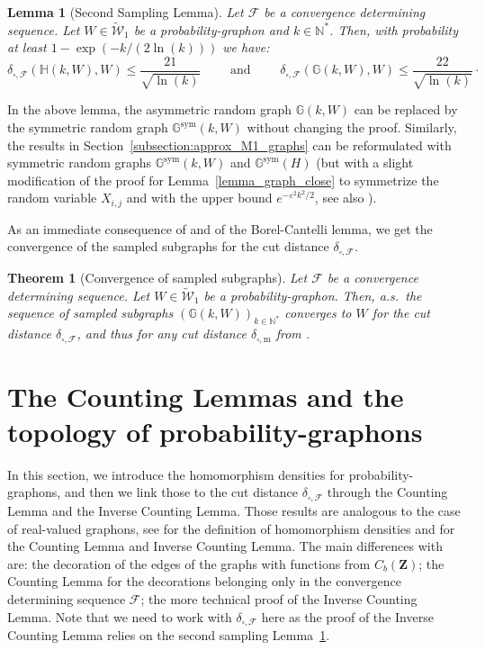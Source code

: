 \documentclass{amsart}
\newcommand{\as}{a.s.\ }
\theoremstyle{plain}
\newtheorem{theo}[Th]{Theorem}
\newtheorem{lemme}[Th]{Lemma}
\theoremstyle{definition}
\newcommand{\Space}{\mathbf{Z}}
\newcommand{\bbG}{\mathbb{G}}
\newcommand{\CbFunct}{C_b(\Space)}
\newcommand{\UGraphon}{\widetilde{\mathcal{W}}_1}
\newcommand{\m}{\mathrm{m}}
\newcommand{\ddcut}{\delta_{\square,\m}}
\newcommand{\ddcutF}{\delta_{\square,\mathcal{F}}}
\newcommand{\F}{\mathcal{F}}
\newcommand{\N}{\mathbb{N}}
\newcommand{\eps}{\varepsilon}
\begin{document}
\begin{lemme}[Second Sampling Lemma]\label{SecondSamplingLemma}
Let $\F$ be a convergence determining sequence.
Let $W\in\UGraphon$ be a probability-graphon and $k\in\N^*$.
Then, with probability at least $1 - \exp( - k / (2\ln(k) ) )$ we have:
\[ \ddcutF( \mathbb{H}(k,W), W) \leq \frac{21}{\sqrt{\ln(k)}}  
\qquad \text{ and  } \qquad
\ddcutF( \mathbb{G}(k,W), W) \leq \frac{22}{\sqrt{\ln(k)}}  \cdot\]
\end{lemme}
In the above lemma, the asymmetric random graph $\mathbb{G}(k,W)$ 
can be replaced by the symmetric random graph $\mathbb{G}^{\text{sym}}(k,W)$
without changing the proof.
Similarly, the results in Section~\ref{subsection:approx_M1_graphs}
can be reformulated with symmetric random graphs $\mathbb{G}^{\text{sym}}(k,W)$ 
	and $\mathbb{G}^{\text{sym}}(H)$
(but with a slight modification of the proof for Lemma~\ref{lemma_graph_close}
	to symmetrize the random variable $X_{i,j}$
	and with the upper bound $e^{-\eps^2k^2/2}$,
	see also \cite[Lemma 10.11]{Lovasz}).

\medskip
As an immediate consequence of  and of the Borel-Cantelli lemma,
we get the convergence of the sampled subgraphs for the cut distance $\ddcutF$.

\begin{theo}[Convergence of sampled subgraphs]
	\label{theo_conv_sampled_subgraphs}
Let $\F$ be a convergence determining sequence.
Let $W\in\UGraphon$ be a probability-graphon.
Then, \as the sequence of sampled subgraphs $(\bbG(k,W))_{k\in\N^*}$
	converges to $W$ for the cut distance $\ddcutF$,
	and thus for any cut distance $\ddcut$ from .
\end{theo}




\section{The Counting Lemmas and the topology of probability-graphons}\label{section_counting_lemmas}

In this section, we introduce the homomorphism densities
for probability-graphons,
and then we link those to the cut distance $\ddcutF$
through the Counting Lemma
and the Inverse Counting Lemma.
Those results are analogous to the case of real-valued graphons,
see  \cite[Chapter 7]{Lovasz} for the definition of homomorphism densities
and \cite[Chapter 10]{Lovasz} for the Counting Lemma and Inverse Counting Lemma.
The main differences with \cite{Lovasz} are: the  decoration of  the edges of the graphs with functions from $\CbFunct$;
the Counting Lemma 
	for the decorations belonging only in the convergence determining sequence $\F$;
the more technical proof of the Inverse Counting Lemma. 
Note that we need to work with $\ddcutF$ here
as the proof of the Inverse Counting Lemma relies on
	the second sampling Lemma~\ref{SecondSamplingLemma}.
\end{document}
